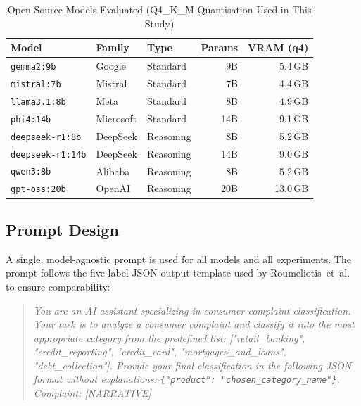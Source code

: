 \documentclass[journal]{IEEEtran}
\begin{document}
\begin{table}[!t]
  \renewcommand{\arraystretch}{1.3}
  \caption{Open-Source Models Evaluated (Q4\_K\_M Quantisation Used in This Study)}
  \label{tab:models}
  \centering
  \footnotesize
  \setlength{\tabcolsep}{3pt}
  \begin{tabular}{@{}lllrr@{}}
    \toprule
    \textbf{Model} & \textbf{Family} & \textbf{Type} & \textbf{Params} & \textbf{VRAM (q4)} \\
    \midrule
    \texttt{gemma2:9b}        & Google     & Standard  & 9B   & 5.4\,GB \\
    \texttt{mistral:7b}       & Mistral    & Standard  & 7B   & 4.4\,GB \\
    \texttt{llama3.1:8b}      & Meta       & Standard  & 8B   & 4.9\,GB \\
    \texttt{phi4:14b}         & Microsoft  & Standard  & 14B  & 9.1\,GB \\
    \midrule
    \texttt{deepseek-r1:8b}   & DeepSeek   & Reasoning & 8B   & 5.2\,GB \\
    \texttt{deepseek-r1:14b}  & DeepSeek   & Reasoning & 14B  & 9.0\,GB \\
    \texttt{qwen3:8b}         & Alibaba    & Reasoning & 8B   & 5.2\,GB \\
    \texttt{gpt-oss:20b}      & OpenAI     & Reasoning & 20B  & 13.0\,GB \\
    \bottomrule
  \end{tabular}
\end{table}

\subsection{Prompt Design}

A single, model-agnostic prompt is used for all models and all
experiments. The prompt follows the five-label JSON-output template
used by Roumeliotis~et~al.\ \cite{roumeliotis2025think} to ensure
comparability:

\begin{quote}
\textit{You are an AI assistant specializing in consumer complaint
classification. Your task is to analyze a consumer complaint and
classify it into the most appropriate category from the predefined
list: ["retail\_banking", "credit\_reporting", "credit\_card",
"mortgages\_and\_loans", "debt\_collection"]. Provide your final
classification in the following JSON format without explanations:
\texttt{\{"product": "chosen\_category\_name"\}}. Complaint: [NARRATIVE]}
\end{quote}
\end{document}
